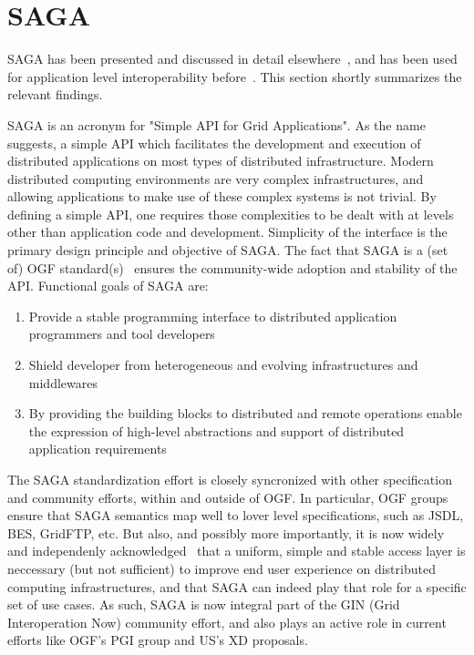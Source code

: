 \documentclass[10pt,conference,final,letterpaper,twoside,twocolumn,]{IEEEtran}
\begin{document}
\section{SAGA}

 SAGA has been presented and discussed in detail
 elsewhere~\cite{sagapub...}, and has been used for application level
 interoperability before~\cite{sagainterop...}.  This section shortly
 summarizes the relevant findings.

 SAGA is an acronym for "Simple API for Grid Applications". As the
 name suggests, a simple API which facilitates the development and
 execution of distributed applications on most types of distributed
 infrastructure.  Modern distributed computing environments are very
 complex infrastructures, and allowing applications to make use of
 these complex systems is not trivial.  By defining a simple API, one
 requires those complexities to be dealt with at levels other than
 application code and development.  Simplicity of the interface is the
 primary design principle and objective of SAGA.  The fact that SAGA
 is a (set of) OGF standard(s)~\cite{sagaspecs...} ensures the
 community-wide adoption and stability of the API.  Functional goals
 of SAGA are:

 \begin{enumerate}

  \item Provide a stable programming interface to distributed
  application programmers and tool developers
 
  \item Shield developer from heterogeneous and evolving
  infrastructures and middlewares

  \item By providing the building blocks to distributed and remote
  operations enable the expression of high-level abstractions and
  support of distributed application requirements

 \end{enumerate}

 The SAGA standardization effort is closely syncronized with other
 specification and community efforts, within and outside of OGF.  In
 particular, OGF groups ensure that SAGA semantics map well to lover
 level specifications, such as JSDL, BES, GridFTP, etc.   But also,
 and possibly more importantly, it is now widely and independenly
 acknowledged~\cite{refs?} that a uniform, simple and stable access
 layer is neccessary (but not sufficient) to improve end user
 experience on distributed computing infrastructures, and that SAGA
 can indeed play that role for a specific set of use cases.  As such,
 SAGA is now integral part of the GIN (Grid Interoperation Now)
 community effort, and also plays an active role in current efforts
 like OGF's PGI group and US's XD proposals.
  
\end{document}
